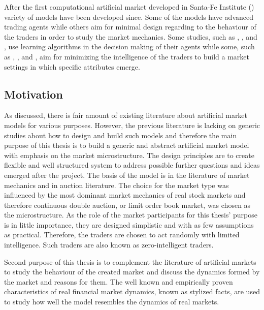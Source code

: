 After the first computational artificial market developed in Santa-Fe Institute
(\citet{SantaFe94}) variety of models have been developed since. Some of the
models have advanced trading agents while others aim for minimal design 
regarding to the behaviour of the traders in order to study the market
mechanics. Some studies, such as \citet{GOYKHMAN20181729}, \citet{IZUMI200535},
\citet{Reinforcement09} and \citet{YEH20102089}, use learning algorithms in the decision making of 
their agents while some, such as \citet{God93}, \citet{Jam96}, \citet{Genoa01} and \citet{Raberto05}, 
aim for minimizing the intelligence of the traders to build a market settings in which
specific attributes emerge. %


\subsection{Motivation}

As discussed, there is fair amount of existing literature about artificial market models for various
purposes. However, the previous literature is lacking on generic studies about how to design
and build such models and therefore the main purpose of this thesis is to build a generic and abstract 
artificial market model with emphasis on the market microstructure. The design principles are to create flexible 
and well structured system to address possible further questions and ideas emerged after the project. 
The basis of the model is in the literature of market mechanics and in auction literature. The choice for the
market type was influenced by the most dominant market mechanics of real stock markets and therefore
continuous double auction, or limit order book market, was chosen as the microstructure. As the 
role of the market participants for this thesis' purpose is in little importance, they are designed
simplistic and with as few assumptions as practical. Therefore, the traders are chosen to act randomly
with limited intelligence. Such traders are also known as zero-intelligent traders. 

Second purpose of this thesis is to complement the literature of artificial markets to study 
the behaviour of the created market and discuss the dynamics formed by the market and reasons for them.
The well known and empirically proven characteristics of real financial market dynamics, known as 
stylized facts, are used to study how well the model resembles the dynamics of real markets.

